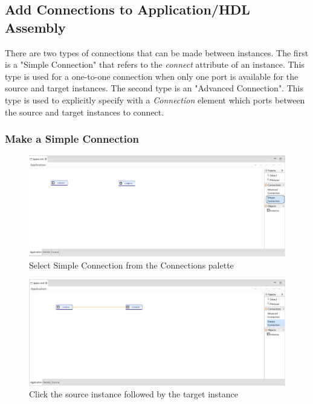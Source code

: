 \subsection{Add Connections to Application/HDL Assembly}
\label{sec:add_application_connections}
\begin{flushleft}

There are two types of connections that can be made between instances. The first is a "Simple Connection" that refers to the \textit{connect} attribute of an instance. This type is used for a one-to-one connection when only one port is available for the source and target instances. The second type is an "Advanced Connection". This type is used to explicitly specify with a \textit{Connection} element which ports between the source and target instances to connect.

\subsubsection{Make a Simple Connection}
\label{sec:add_simple_connection}

\begin{figure}[h!]
    \centering
	\includegraphics[scale=0.31]{figures/connect-selected.jpg}
	\caption{Select Simple Connection from the Connections palette}
	\label{fig:figure19}
\end{figure}

\begin{figure}[h!]
    \centering
	\includegraphics[scale=0.31]{figures/connect-made.jpg}
	\caption{Click the source instance followed by the target instance}
	\label{fig:figure20}
\end{figure}


\end{flushleft}
